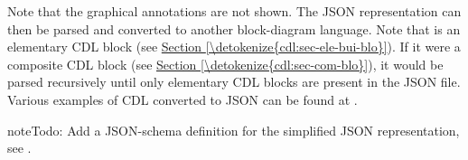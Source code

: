 \documentclass[letterpaper,10pt, openany,english]{sphinxmanual}
\begin{document}
\begin{sphinxVerbatim}[commandchars=\\\{\},numbers=left,firstnumber=1,stepnumber=1]
           
           
      \PYG{p}{]}
      \PYG{p}{[}
           
           
           
           
      \PYG{p}{]}
      \PYG{p}{[}
           
           
           
      \PYG{p}{]}
    \PYG{p}{]}
\PYG{p}{]}
\end{sphinxVerbatim}

Note that the graphical annotations are not shown.
The JSON representation can then be parsed and converted to another block-diagram
language.
Note that  is an elementary CDL block
(see \hyperref[\detokenize{cdl:sec-ele-bui-blo}]{Section \ref{\detokenize{cdl:sec-ele-bui-blo}}}).
If it were a
composite CDL block (see \hyperref[\detokenize{cdl:sec-com-blo}]{Section \ref{\detokenize{cdl:sec-com-blo}}}), it would be parsed recursively
until only elementary CDL blocks are present in the JSON file.
Various examples of CDL converted to JSON can be found at
.

\begin{sphinxadmonition}{note}{\label{codeGeneration:index-0}Todo:}
Add a JSON-schema definition for the simplified JSON representation,
see .
\end{sphinxadmonition}
\end{document}

